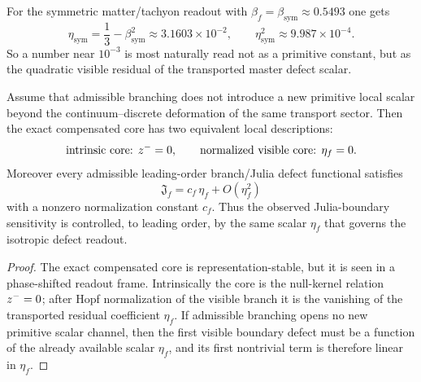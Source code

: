 \begin{remark}
For the symmetric matter/tachyon readout with $\beta_f=\beta_{\mathrm{sym}}\approx0.5493$ one gets
\[
  \eta_{\mathrm{sym}}=\frac13-\beta_{\mathrm{sym}}^2\approx 3.1603\times10^{-2},
  \qquad
  \eta_{\mathrm{sym}}^2\approx 9.987\times10^{-4}.
\]
So a number near $10^{-3}$ is most naturally read not as a primitive constant, but as the quadratic visible residual of the transported master defect scalar.
\end{remark}

\begin{proposition}
\label{prop:julia-master-residual}
Assume that admissible branching does not introduce a new primitive local scalar beyond the continuum--discrete deformation of the same transport sector. Then the exact compensated core has two equivalent local descriptions:
\[
  \text{intrinsic core: }z^-=0,
  \qquad
  \text{normalized visible core: }\eta_f=0.
\]
Moreover every admissible leading-order branch/Julia defect functional satisfies
\[
  \mathfrak J_f=c_f\,\eta_f+O(\eta_f^2)
\]
with a nonzero normalization constant $c_f$. Thus the observed Julia-boundary sensitivity is controlled, to leading order, by the same scalar $\eta_f$ that governs the isotropic defect readout.
\end{proposition}

\begin{proof}
The exact compensated core is representation-stable, but it is seen in a phase-shifted readout frame. Intrinsically the core is the null-kernel relation $z^-=0$; after Hopf normalization of the visible branch it is the vanishing of the transported residual coefficient $\eta_f$. If admissible branching opens no new primitive scalar channel, then the first visible boundary defect must be a function of the already available scalar $\eta_f$, and its first nontrivial term is therefore linear in $\eta_f$.
\end{proof}

